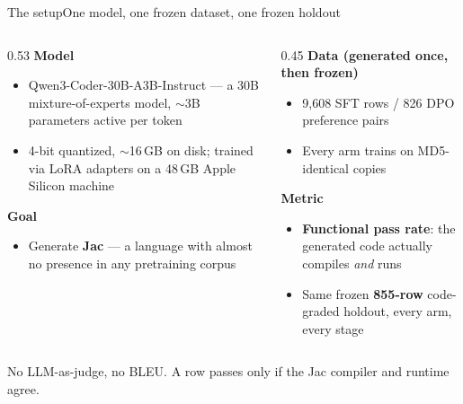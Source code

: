 \documentclass[aspectratio=169,11pt]{beamer}
\newcommand{\srcnote}[1]{\vfill{\scriptsize\color{jsMute}#1}}
\begin{document}
\begin{frame}{The setup}{One model, one frozen dataset, one frozen holdout}
  \small
  \begin{columns}[T]
    \begin{column}{0.53\textwidth}
      \textbf{Model}
      \begin{itemize}
        \item Qwen3-Coder-30B-A3B-Instruct --- a 30B mixture-of-experts model, $\sim$3B parameters active per token
        \item 4-bit quantized, $\sim$16\,GB on disk; trained via LoRA adapters on a 48\,GB Apple Silicon machine
      \end{itemize}
      \vspace{0.6em}
      \textbf{Goal}
      \begin{itemize}
        \item Generate \textbf{Jac} --- a language with almost no presence in any pretraining corpus
      \end{itemize}
    \end{column}
    \begin{column}{0.45\textwidth}
      \textbf{Data (generated once, then frozen)}
      \begin{itemize}
        \item 9{,}608 SFT rows / 826 DPO preference pairs
        \item Every arm trains on MD5-identical copies
      \end{itemize}
      \vspace{0.6em}
      \textbf{Metric}
      \begin{itemize}
        \item \textbf{Functional pass rate}: the generated code actually compiles \emph{and} runs
        \item Same frozen \textbf{855-row} code-graded holdout, every arm, every stage
      \end{itemize}
    \end{column}
  \end{columns}
  \srcnote{No LLM-as-judge, no BLEU. A row passes only if the Jac compiler and runtime agree.}
\end{frame}
\end{document}
